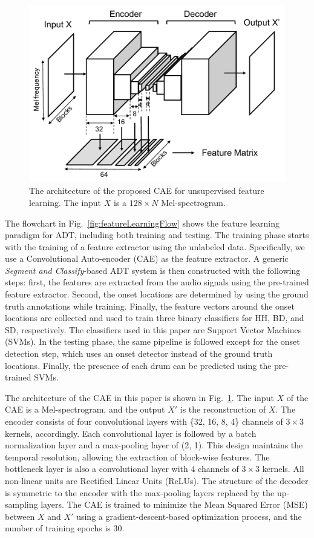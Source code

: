 \documentclass{article}
\begin{document}
\begin{figure}
\centering
\includegraphics[width = \columnwidth]{./figs/caeStructure.pdf}
\caption{The architecture of the proposed CAE for unsupervised feature learning. The input $X$ is a $128 \times N$ Mel-spectrogram.}
\label{fig:caeStructure}
\end{figure}

The flowchart in Fig.~\ref{fig:featureLearningFlow} shows the feature learning paradigm for ADT, including both training and testing. The training phase starts with the training of a feature extractor using the unlabeled data. Specifically, we use a Convolutional Auto-encoder (CAE) as the feature extractor. A generic \textit{Segment and Classify}-based ADT system is then constructed with the following steps: first, the features are extracted from the audio signals using the pre-trained feature extractor. Second, the onset locations are determined by using the ground truth annotations while training. Finally, the feature vectors around the onset locations are collected and used to train three binary classifiers for HH, BD, and SD, respectively. The classifiers used in this paper are Support Vector Machines (SVMs). In the testing phase, the same pipeline is followed except for the onset detection step, which uses an onset detector instead of the ground truth locations. Finally, the presence of each drum can be predicted using the pre-trained SVMs. 

The architecture of the CAE in this paper is shown in Fig.~\ref{fig:caeStructure}. The input $X$ of the CAE is a Mel-spectrogram, and the output $X'$ is the reconstruction of $X$. The encoder consists of four convolutional layers with \{32, 16, 8, 4\} channels of $3 \times 3$ kernels, accordingly. Each convolutional layer is followed by a batch normalization layer and a max-pooling layer of (2, 1). This design maintains the temporal resolution, allowing the extraction of block-wise features. 
The bottleneck layer is also a convolutional layer with 4 channels of $3 \times 3$ kernels. All non-linear units are Rectified Linear Units (ReLUs).
The structure of the decoder is symmetric to the encoder with the max-pooling layers replaced by the up-sampling layers.  
The CAE is trained to minimize the Mean Squared Error (MSE) between $X$ and $X'$ using a gradient-descent-based optimization process, and the number of training epochs is $30$. 
\end{document}
